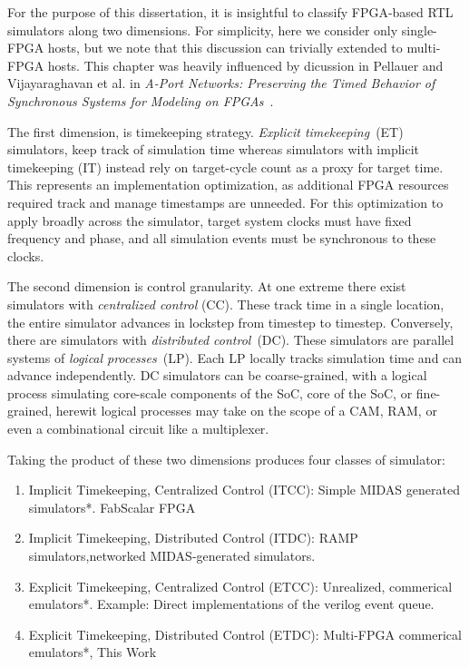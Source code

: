 

For the purpose of this dissertation, it is insightful to classify FPGA-based
RTL simulators along two dimensions. For simplicity, here we consider only
single-FPGA hosts, but we note that this discussion can trivially extended to
multi-FPGA hosts. This chapter was heavily influenced by dicussion in Pellauer
and Vijayaraghavan et al. in \emph{A-Port Networks: Preserving the Timed
Behavior of Synchronous Systems for Modeling on FPGAs}~\cite{APortNetwork}.

The first dimension, is timekeeping strategy. \emph{Explicit timekeeping}~(ET)
simulators, keep track of simulation time whereas simulators with implicit
timekeeping (IT) instead rely on target-cycle count as a proxy for target time. This represents an
implementation optimization, as additional FPGA resources required track and
manage timestamps are unneeded. For this optimization to apply broadly across
the simulator, target system clocks must have fixed frequency and phase, and
all simulation events must be synchronous to these clocks.

The second dimension is control granularity. At one extreme there exist
simulators with \emph{centralized control} (CC). These track time in
a single location, the entire simulator advances in lockstep from
timestep to timestep.  Conversely, there are simulators with \emph{distributed
control}~(DC). These simulators are parallel systems of \emph{logical
processes}~(LP). Each LP locally tracks simulation time and can advance
independently. DC simulators can be coarse-grained, with a logical process
simulating core-scale components of the SoC, core of the SoC, or fine-grained,
herewit logical processes may take on the scope of a CAM, RAM, or even a
combinational circuit like a multiplexer.

Taking the product of these two dimensions produces four classes of simulator:

\begin{enumerate}
\item{Implicit Timekeeping, Centralized Control (ITCC)}: Simple MIDAS generated simulators*. FabScalar FPGA

\item{Implicit Timekeeping, Distributed Control (ITDC)}: RAMP simulators,networked MIDAS-generated simulators.

\item{Explicit Timekeeping, Centralized Control (ETCC)}: Unrealized, commerical emulators*. Example: Direct implementations of the verilog event queue.

\item{Explicit Timekeeping, Distributed Control (ETDC)}: Multi-FPGA commerical emulators*, This Work
\end{enumerate}

